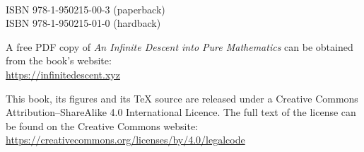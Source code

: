 {\small
~

\vfill

\thispagestyle{empty}


ISBN 978-1-950215-00-3 (paperback)\\
ISBN 978-1-950215-01-0 (hardback)

\begin{minipage}{0.75\textwidth}
\small
A free PDF copy of \textit{An Infinite Descent into Pure Mathematics} can be obtained from the book's website:\\
\url{https://infinitedescent.xyz}
\end{minipage}

\begin{minipage}{0.75\textwidth}
\small
This book, its figures and its \TeX{} source are released under a Creative Commons Attribution--ShareAlike 4.0 International Licence. The full text of the license can be found on the Creative Commons website:\\
\url{https://creativecommons.org/licenses/by/4.0/legalcode}
\end{minipage}

}